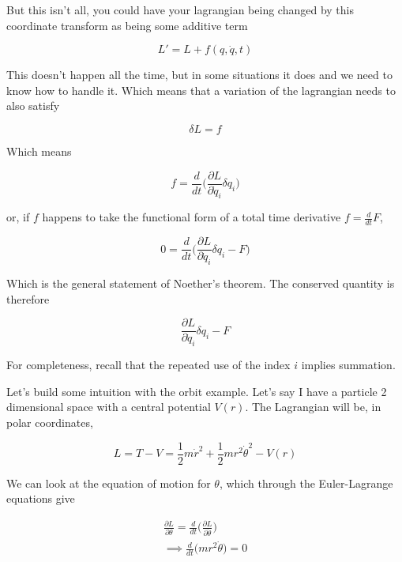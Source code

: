 \documentclass{article}
\begin{document}
But this isn't all, you could have your lagrangian being changed by this coordinate transform as being some additive term

\begin{equation}
    L' = L + f(q,\dot{q},t)
\end{equation}

This doesn't happen all the time, but in some situations it does and we need to know how to handle it. Which means that a variation of the lagrangian needs to also satisfy

\begin{equation}
    \delta L = f
\end{equation}

Which means

\begin{equation}
    f =\frac{d}{dt}\biggl(\frac{\partial L}{\partial \dot{q}_i}\delta q_i\bigg)
\end{equation}

or, if $f$ happens to take the functional form of a total time derivative $f = \frac{d}{dt}F$,

\begin{equation}
    0 =\frac{d}{dt}\biggl(\frac{\partial L}{\partial \dot{q}_i}\delta q_i - F\bigg)
\end{equation}

Which is the general statement of Noether's theorem. The conserved quantity is therefore

\begin{equation}
    \frac{\partial L}{\partial \dot{q}_i}\delta q_i - F
\end{equation}

For completeness, recall that the repeated use of the index $i$ implies summation.

Let's build some intuition with the orbit example. Let's say I have a particle 2 dimensional space with a central potential $V(r)$. The Lagrangian will be, in polar coordinates,

\begin{equation}
    L = T - V = \frac{1}{2}m\dot{r}^2 + \frac{1}{2}mr^2\dot{\theta}^2 - V(r)
\end{equation}

We can look at the equation of motion for $\theta$, which through the Euler-Lagrange equations give

\begin{align}
    \frac{\partial L}{\partial \theta} = \frac{d}{dt}\biggl(\frac{\partial L}{\partial \dot{\theta}}\biggr) \\
    \implies \frac{d}{dt} \biggl(mr^2\dot{\theta} \biggr) = 0
\end{align}
\end{document}
